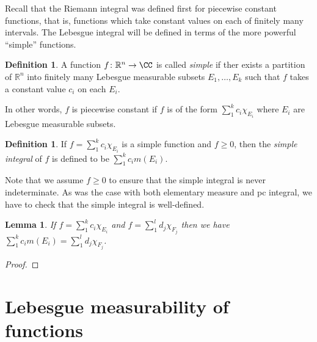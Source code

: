 \documentclass[11pt,oneside]{amsbook}
\newcommand{\RR}{\mathbb R}
\theoremstyle{definition}
\theoremstyle{plain}
\newtheorem{lem}[thm]{Lemma}
\theoremstyle{definition}
\newtheorem{defn}[thm]{Definition}
\theoremstyle{remark}
\numberwithin{equation}{section}
\numberwithin{figure}{section}
\begin{document}
Recall that the Riemann integral was defined first for piecewise constant functions, that is, functions which take constant values on each of finitely many intervals. The Lebesgue integral will be defined in terms of the more powerful ``simple'' functions.

\begin{defn}
  A function $f\colon\RR^n\to\CC$ is called \emph{simple} if ther exists a partition of $\RR^n$ into finitely many Lebesgue measurable subsets $E_1,\ldots,E_k$ such that $f$ takes a constant value $c_i$ on each $E_i$.
\end{defn}

In other words, $f$ is piecewise constant if $f$ is of the form $\sum_1^kc_i\chi_{E_i}$ where $E_i$ are Lebesgue measurable subsets.

\begin{defn}
  If $f=\sum_1^kc_i\chi_{E_i}$ is a simple function and $f\geq0$, then the \emph{simple integral} of $f$ is defined to be $\sum_1^kc_im(E_i)$.
\end{defn}

Note that we assume $f\geq0$ to ensure that the simple integral is never indeterminate. As was the case with both elementary measure and pc integral, we have to check that the simple integral is well-defined.

\begin{lem}
  If $f=\sum_1^kc_i\chi_{E_i}$ and $f=\sum_1^ld_j\chi_{F_j}$ then we have $\sum_1^kc_im(E_i)=\sum_1^ld_j\chi_{F_j}$.
\end{lem}

\begin{proof}

\end{proof}


\section{Lebesgue measurability of functions}




\end{document}
